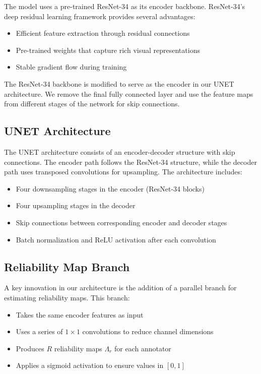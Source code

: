 The model uses a pre-trained ResNet-34 as its encoder backbone.
ResNet-34's deep residual learning framework provides several advantages:

\begin{itemize}
  \item Efficient feature extraction through residual connections
  \item Pre-trained weights that capture rich visual representations
  \item Stable gradient flow during training
\end{itemize}

The ResNet-34 backbone is modified to serve as the encoder in our
UNET architecture. We remove the final fully connected layer and use
the feature maps from different stages of the network for skip connections.

\subsection{UNET Architecture}

The UNET architecture consists of an encoder-decoder structure with
skip connections. The encoder path follows the ResNet-34 structure,
while the decoder path uses transposed convolutions for upsampling.
The architecture includes:

\begin{itemize}
  \item Four downsampling stages in the encoder (ResNet-34 blocks)
  \item Four upsampling stages in the decoder
  \item Skip connections between corresponding encoder and decoder stages
  \item Batch normalization and ReLU activation after each convolution
\end{itemize}

\subsection{Reliability Map Branch}

A key innovation in our architecture is the addition of a parallel
branch for estimating reliability maps. This branch:

\begin{itemize}
  \item Takes the same encoder features as input
  \item Uses a series of $1 \times 1$ convolutions to reduce channel dimensions
  \item Produces $R$ reliability maps $\Lambda_r$ for each annotator
  \item Applies a sigmoid activation to ensure values in $[0,1]$
\end{itemize}

